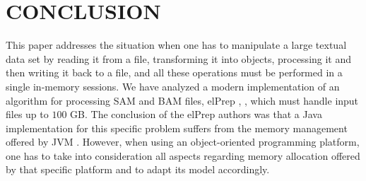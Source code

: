 \documentclass[a4paper,twoside]{article}
\begin{document}
%
%



\section{\uppercase{Conclusion}}
This paper addresses the situation when one has to manipulate a large textual data set by reading it from a file, transforming it into objects, processing it and then writing it back to a file, and all these operations must be performed in a single in-memory sessions.
We have analyzed a modern implementation of an algorithm for processing SAM and BAM files, elPrep \cite{herzeel:2015}, \cite{herzeel:2019}, which must handle input files up to $100$ GB.
The conclusion of the elPrep authors was that a Java implementation for this specific problem suffers from the memory management offered by JVM \cite{costanza:2019}.
However, when using an object-oriented programming platform, one has to take into consideration all aspects regarding memory allocation offered by that specific platform and to adapt its model accordingly. 
\end{document}
